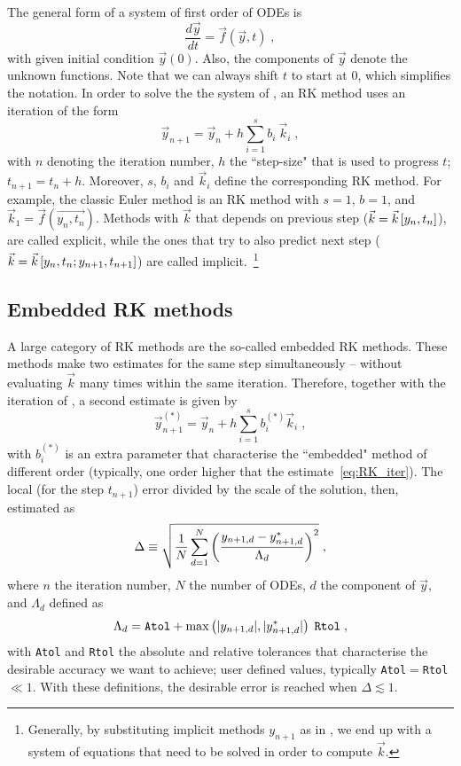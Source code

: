 \documentclass[11pt,a4paper]{article}
\begin{document}
The general form of a system of first order of ODEs is
%
\begin{equation}
	\dfrac{d\vec{y}}{dt}=\vec{f}(\vec{y},t) \;,
	\label{eq:ODE_definition}
\end{equation}
%
with given initial condition $\vec{y}(0)$. Also, the components of $\vec{y}$ denote the unknown functions. Note that we can always shift $t$ to start at $0$, which simplifies the notation. In order to solve the the system of , an RK method uses an iteration of the form 
%
\begin{equation}
	\vec{y}_{n+1}=\vec{y}_{n}+ h\sum_{i=1}^{s} b_i \ \vec{k}_i \;,
	\label{eq:RK_iter}
\end{equation}
%
with $n$ denoting the iteration number, $h$ the ``step-size" that is used to progress $t$; $t_{n+1}=t_{n}+h$. Moreover, $s$, $b_i$ and $\vec{k}_i$ define the corresponding RK method. For example,
the classic Euler method is an RK method with $s=1$, $b=1$, and $\vec{k}_1 = \vec{f}(\vec{y_n , t_n})$. Methods with $\vec{k}$ that depends on previous step (\ie $\vec{k} =\vec{k}\left[ y_{n},t_{n} \right]$), are called explicit, while the ones that try to also predict next step (\ie $\vec{k} =\vec{k}\left[ y_{n},t_{n}; y_{n+1},t_{n+1} \right]$) are called implicit.~\footnote{Generally, by substituting  implicit methods $y_{n+1}$ as in , we end up with a system of equations that need to be solved in order to compute $\vec{k}$.} 

\subsection{Embedded RK methods}
%
A large category of RK methods are  the so-called embedded RK methods. These methods make two estimates for the same step simultaneously -- without evaluating  $\vec{k}$ many times within the same iteration. Therefore, together with the iteration of , a second estimate is given by
%
\begin{equation}
	\vec{y}_{n+1}^{(*)}=\vec{y}_{n}+ h\sum_{i=1}^{s} b_i^{(*)} \vec{k}_i \;,
	\label{eq:RK_Embedded_iter}
\end{equation}
%
with $b_i^{(*)}$ is an extra parameter that characterise the ``embedded" method of different order (typically, one order higher that the estimate~\ref{eq:RK_iter}). The local (for the step $t_{n+1}$) error divided by the scale of the solution, then, estimated as
%
\begin{equation}
	\Delta \equiv  \sqrt{\frac{1}{N}\sum_{d=1}^{N}\left( \frac{y_{n+1 ,d}-y^{*}_{n+1,d}}{ \Lambda_d } \right)^{2}} \;,
	\label{eq:error_estimate}
\end{equation}
%
where $n$ the iteration number, $N$ the number of ODEs, $d$ the component of $\vec{y}$, and $\Lambda_d$ defined as 
%
\begin{equation}
	\Lambda_d = {\tt Atol} + \max\left( |y_{n+1, d}|,|y^{*}_{n+1 ,d}| \right) \; {\tt Rtol} \;,
	\label{eq:RK_scale}
\end{equation}
%
with {\tt Atol} and {\tt Rtol} the absolute and relative tolerances that characterise the desirable accuracy we want to achieve; user defined values, typically {\tt Atol}$=${\tt Rtol}$\ll 1$.  With these definitions, the desirable error is reached when  $\Delta \lesssim 1$. 
\end{document}

